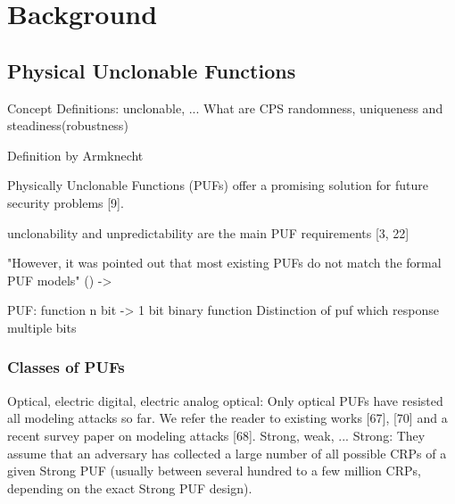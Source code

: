 \chapter{Background}
\label{cap:background}

\section{Physical Unclonable Functions}
\label{sec:pyhsicalunclonablefunctions}



Concept \cite{Suh2007PhysicalGeneration}
Definitions: unclonable, ...
What are CPS
randomness, uniqueness and steadiness(robustness) \cite{CherifJouini2011PerformanceStatistics}

Definition by Armknecht

Physically Unclonable Functions (PUFs) offer a promising solution for future security problems [9].
\cite{Tajik2014PhysicalPUFs}

unclonability and unpredictability are the main PUF requirements [3, 22]
\cite{Tajik2014PhysicalPUFs}

"However, it was pointed out that most existing PUFs do not match the formal PUF models" (\cite{Becker2015ThePUFs}) -> \cite{Ruhrmair2013PUFsEvaluations}

PUF: function n bit -> 1 bit
binary function
Distinction of puf which response multiple bits






\subsection{Classes of PUFs}

Optical, electric digital, electric analog
optical: Only optical PUFs have resisted all modeling attacks so far. We refer the reader to existing works [67], [70] and a recent survey paper on modeling attacks [68]. \cite{Ruhrmair2014PUFsGlance}
Strong, weak, ...  
Strong: They assume that an adversary has collected a large number of all possible CRPs of a given Strong PUF (usually between several hundred to a few million CRPs, depending on the exact Strong PUF design). \cite{Ruhrmair2014PUFsGlance}

